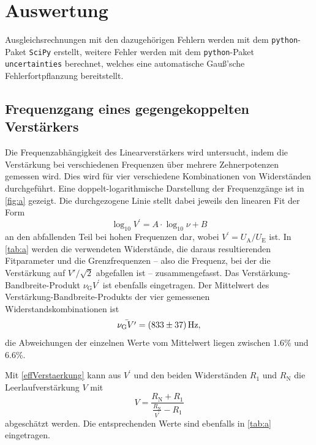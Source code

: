 \section{Auswertung}
\label{sec:evaluation}
Ausgleichsrechnungen mit den dazugehörigen Fehlern werden mit dem \texttt{python}-Paket \texttt{SciPy} \cite{scipy} erstellt, weitere Fehler werden mit dem \texttt{python}-Paket \texttt{uncertainties} \cite{uncertain} berechnet, welches eine automatische Gauß'sche Fehlerfortpflanzung bereitstellt.

\subsection{Frequenzgang eines gegengekoppelten Verst\"{a}rkers}
\label{Frequenzgang}
Die Frequenzabhängigkeit des Linearverstärkers wird untersucht, indem die Verstärkung bei verschiedenen Frequenzen über mehrere Zehnerpotenzen gemessen wird. Dies wird für vier verschiedene Kombinationen von Widerständen durchgeführt. Eine doppelt-logarithmische Darstellung der Frequenzgänge ist in \autoref{fig:a} gezeigt. Die durchgezogene Linie stellt dabei jeweils den linearen Fit der Form
\begin{equation}
	\log_{10} V^\prime = A \cdot \log_{10} \nu + B
	\label{linear_fit}
\end{equation}
an den abfallenden Teil bei hohen Frequenzen dar, wobei $V^\prime = U_\text{A} / U_\text{E}$ ist. In \autoref{tab:a} werden die verwendeten Widerstände, die daraus resultierenden Fitparameter und die Grenzfrequenzen -- also die Frequenz, bei der die Verstärkung auf $V'/\sqrt{2}$ abgefallen ist -- zusammengefasst. Das Verstärkung-Bandbreite-Produkt $\nu_\text{G}V^\prime$ ist ebenfalls eingetragen. Der Mittelwert des Verstärkung-Bandbreite-Produkts der vier gemessenen Widerstandskombinationen ist
\begin{equation*}
	\bar{\nu_\text{G}V^\prime} = \SI{833 \pm 37}{\hertz},
\end{equation*}
die Abweichungen der einzelnen Werte vom Mittelwert liegen zwischen 1.6\% und 6.6\%.\par
Mit \autoref{effVerstaerkung} kann aus $V^\prime$ und den beiden Widerständen $R_1$ und $R_\text{N}$ die Leerlaufverstärkung $V$ mit
\begin{equation}
	V = \frac{R_\text{N} + R_1}{\frac{R_\text{N}}{V^\prime} - R_1}
\end{equation}
abgeschätzt werden. Die entsprechenden Werte sind ebenfalls in \autoref{tab:a} eingetragen.\par
